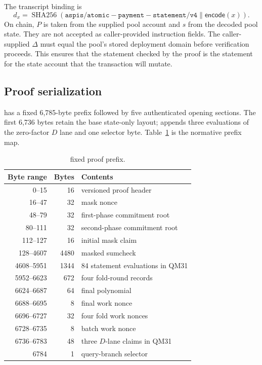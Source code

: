 The transcript binding is
\[
  d_x=\operatorname{SHA256}(
  \mathtt{aspis/atomic-payment-statement/v4}\mathbin\|\mathsf{encode}(x)).
\]
On chain, \(P\) is taken from the supplied pool account and \(s\) from the
decoded pool state.  They are not accepted as caller-provided instruction
fields.  The caller-supplied \(\Delta\) must equal the pool's stored
deployment domain before verification proceeds.  This ensures that the statement checked by the proof is the statement
for the state account that the transaction will mutate.

\subsection{Proof serialization}
\label{sec:implementation-proof-wire}

\Profile{} has a fixed 6,785-byte prefix followed by five authenticated opening
sections.  The first 6,736 bytes retain the base state-only layout; \Profile{}
appends three evaluations of the zero-factor \(D\) lane and one selector byte.
Table~\ref{tab:proof-prefix} is the normative prefix map.

\begin{table}[t]
  \centering
  \small
  \caption{\Profile{} fixed proof prefix.}
  \label{tab:proof-prefix}
  \begin{tabular}{r r l}
    \toprule
    Byte range & Bytes & Contents \\
    \midrule
    0--15       & 16   & versioned proof header \\
    16--47      & 32   & mask nonce \\
    48--79      & 32   & first-phase commitment root \\
    80--111     & 32   & second-phase commitment root \\
    112--127    & 16   & initial mask claim \\
    128--4607   & 4480 & masked sumcheck \\
    4608--5951  & 1344 & 84 statement evaluations in QM31 \\
    5952--6623  & 672  & four fold-round records \\
    6624--6687  & 64   & final polynomial \\
    6688--6695  & 8    & final work nonce \\
    6696--6727  & 32   & four fold work nonces \\
    6728--6735  & 8    & batch work nonce \\
    6736--6783  & 48   & three \(D\)-lane claims in QM31 \\
    6784         & 1    & query-branch selector \\
    \bottomrule
  \end{tabular}
\end{table}


